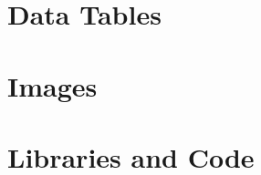 \documentclass[12pt,a4paper]{article}
\begin{document}




\newpage
\appendix
{}
\section{Data Tables}


\newpage
\section{Images}


\newpage
\section{Libraries and Code}

\\


\newpage
\let\Section\section 
\def\section*#1{\Section{#1}} 


\end{document}
